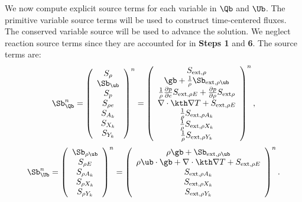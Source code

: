 We now compute explicit source terms for each variable in $\Qb$ and
$\Ub$.  The primitive variable source terms will be used to construct
time-centered fluxes.  The conserved variable source will be used to
advance the solution.  We neglect reaction source terms since they are
accounted for in {\bf Steps 1} and {\bf 6}.  The source terms are:
\begin{equation}
\Sb_{\Qb}^n =
\left(\begin{array}{c}
S_\rho \\
\Sb_{\ub} \\
S_p \\
S_{\rho e} \\
S_{A_k} \\
S_{X_k} \\
S_{Y_k}
\end{array}\right)^n
=
\left(\begin{array}{c}
S_{{\rm ext},\rho} \\
\gb + \frac{1}{\rho}\Sb_{{\rm ext},\rho\ub} \\
\frac{1}{\rho}\frac{\partial p}{\partial e}S_{{\rm ext},\rho E} + \frac{\partial p}{\partial\rho}S_{{\rm ext}\rho} \\
\nabla\cdot\kth\nabla T + S_{{\rm ext},\rho E} \\
\frac{1}{\rho}S_{{\rm ext},\rho A_k} \\
\frac{1}{\rho}S_{{\rm ext},\rho X_k} \\
\frac{1}{\rho}S_{{\rm ext},\rho Y_k}
\end{array}\right)^n,
\end{equation}
\begin{equation}
\Sb_{\Ub}^n =
\left(\begin{array}{c}
\Sb_{\rho\ub} \\
S_{\rho E} \\
S_{\rho A_k} \\
S_{\rho X_k} \\
S_{\rho Y_k}
\end{array}\right)^n
=
\left(\begin{array}{c}
\rho \gb + \Sb_{{\rm ext},\rho\ub} \\
\rho \ub \cdot \gb + \nabla\cdot\kth\nabla T + S_{{\rm ext},\rho E} \\
S_{{\rm ext},\rho A_k} \\
S_{{\rm ext},\rho X_k} \\
S_{{\rm ext},\rho Y_k}
\end{array}\right)^n.
\end{equation}


